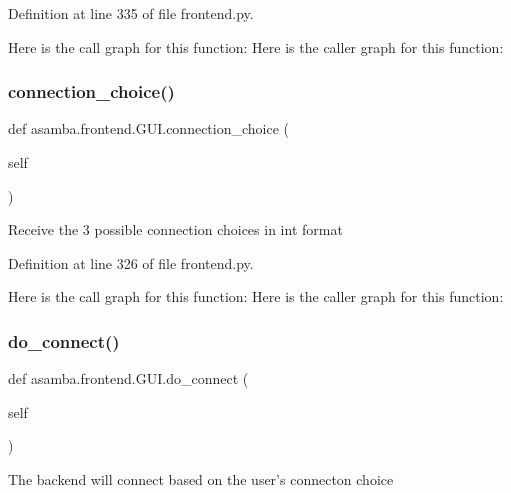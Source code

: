 Definition at line 335 of file frontend.\+py.

Here is the call graph for this function\+:
Here is the caller graph for this function\+:
\mbox{\label{classasamba_1_1frontend_1_1_g_u_i_a4c88f62e31fe47af19c81215df643945}} 
\subsubsection{\texorpdfstring{connection\+\_\+choice()}{connection\_choice()}}
{\footnotesize\ttfamily def asamba.\+frontend.\+G\+U\+I.\+connection\+\_\+choice (\begin{DoxyParamCaption}\item[{}]{self }\end{DoxyParamCaption})}

\begin{DoxyVerb}Receive the 3 possible connection choices in int format \end{DoxyVerb}
 

Definition at line 326 of file frontend.\+py.

Here is the call graph for this function\+:
Here is the caller graph for this function\+:
\mbox{\label{classasamba_1_1frontend_1_1_g_u_i_afb43aa6632c5aa17f9cf4a0270659a7f}} 
\subsubsection{\texorpdfstring{do\+\_\+connect()}{do\_connect()}}
{\footnotesize\ttfamily def asamba.\+frontend.\+G\+U\+I.\+do\+\_\+connect (\begin{DoxyParamCaption}\item[{}]{self }\end{DoxyParamCaption})}

\begin{DoxyVerb}The backend will connect based on the user's connecton choice \end{DoxyVerb}
 

